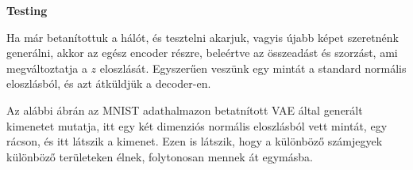\documentclass[12pt]{amsart}
\begin{document}
\vspace{10pt}

\textbf{Testing}

\vspace{10pt}

Ha már betanítottuk a hálót, és tesztelni akarjuk, vagyis
újabb képet szeretnénk generálni, akkor az egész encoder
részre, beleértve az összeadást és szorzást, ami
megváltoztatja a $z$ eloszlását. Egyszerűen veszünk egy
mintát a standard normális eloszlásból, és azt átküldjük a
decoder-en.

Az alábbi ábrán az MNIST adathalmazon betatnított VAE által
generált kimenetet mutatja, itt egy két dimenziós normális
eloszlásból vett mintát, egy rácson, és itt látszik a
kimenet. Ezen is látszik, hogy a különböző számjegyek
különböző területeken élnek, folytonosan mennek át
egymásba. 
\end{document}
